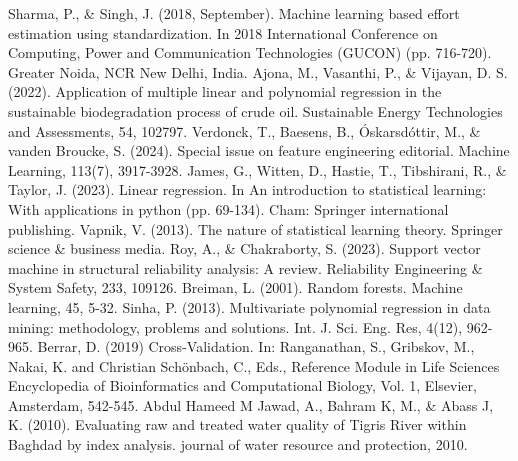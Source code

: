 \documentclass[12pt,a4paper]{article}
\begin{document}
\begin{enumerate}
\begin{thebibliography}{99}
 Sharma, P., \& Singh, J. (2018, September). Machine learning based effort estimation using standardization. In 2018 International Conference on Computing, Power and Communication Technologies (GUCON) (pp. 716-720).  Greater Noida, NCR New Delhi, India.
 Ajona, M., Vasanthi, P., \& Vijayan, D. S. (2022). Application of multiple linear and polynomial regression in the sustainable biodegradation process of crude oil. Sustainable Energy Technologies and Assessments, 54, 102797.
 Verdonck, T., Baesens, B., Óskarsdóttir, M., \& vanden Broucke, S. (2024). Special issue on feature engineering editorial. Machine Learning, 113(7), 3917-3928.
 James, G., Witten, D., Hastie, T., Tibshirani, R., \& Taylor, J. (2023). Linear regression. In An introduction to statistical learning: With applications in python (pp. 69-134). Cham: Springer international publishing.
 Vapnik, V. (2013). The nature of statistical learning theory. Springer science \& business media.
 Roy, A., \& Chakraborty, S. (2023). Support vector machine in structural reliability analysis: A review. Reliability Engineering \& System Safety, 233, 109126.
 Breiman, L. (2001). Random forests. Machine learning, 45, 5-32.
 Sinha, P. (2013). Multivariate polynomial regression in data mining: methodology, problems and solutions. Int. J. Sci. Eng. Res, 4(12), 962-965.
 Berrar, D. (2019) Cross-Validation. In: Ranganathan, S., Gribskov, M., Nakai, K. and Christian Schönbach, C., Eds., Reference Module in Life Sciences Encyclopedia of Bioinformatics and Computational Biology, Vol. 1, Elsevier, Amsterdam, 542-545.
 Abdul Hameed M Jawad, A., Bahram K, M., \& Abass J, K. (2010). Evaluating raw and treated water quality of Tigris River within Baghdad by index analysis. journal of water resource and protection, 2010.
\end{thebibliography}

\end{enumerate}

\label{LastPage}
\end{document}

